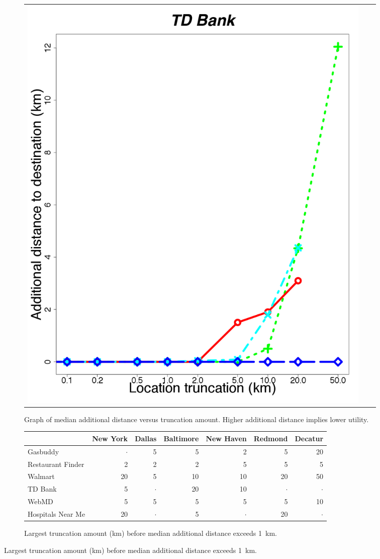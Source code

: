 \begin{figure}[t!]
\begin{subfigure}[t]{\textwidth}
\begin{tabular}{ccc}
    \begin{minipage}{2in}
      \includegraphics[width=\textwidth]
                      {location_privacy/data/tdbank/plots/medians_across_city_additional_distance}
    \end{minipage}
  \end{tabular}
  \caption{Graph of median additional distance versus
    truncation amount.  Higher additional distance implies lower
    utility.}
  \label{fig:add_distance}
  \end{subfigure}

  \bigskip{}

  \begin{subfigure}[t]{\textwidth}
 \small
 \centering
 \begin{tabular}{|l|rrrrrr|}
 \hline
 & New York & Dallas & Baltimore & New Haven & Redmond & Decatur \\
 \hline
 Gasbuddy & $\cdot$ & 5 & 5 & 2 & 5 & 20 \\
Restaurant Finder & 2 & 2 & 2 & 5 & 5 & 5 \\
Walmart & 20 & 5 & 10 & 10 & 20 & 50 \\
TD Bank & 5 & $\cdot$ & 20 & 10 & $\cdot$ & $\cdot$ \\
WebMD & 5 & 5 & 5 & 5 & 5 & 10 \\
Hospitals Near Me & 20 & $\cdot$ & 5 & $\cdot$ & 20 & $\cdot$ \\
\hline
\end{tabular}
\caption{Largest truncation amount (km) before median additional
  distance exceeds 1~km.}
 \label{fig:knee-points-additional-cutoff}


\end{subfigure}
\end{figure}
